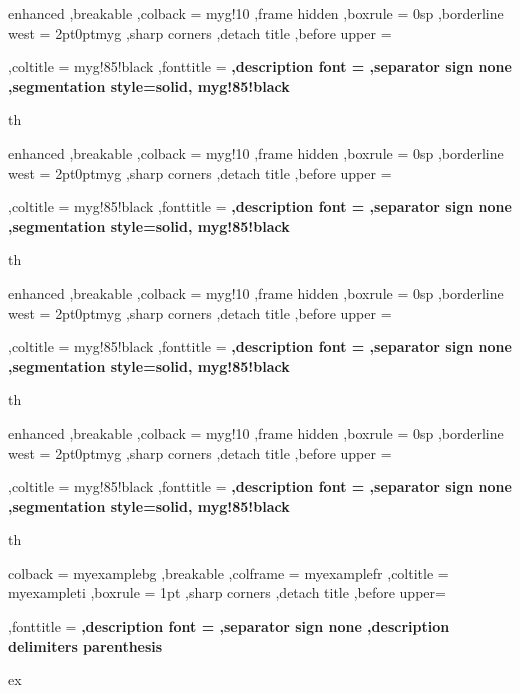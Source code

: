 
{%
	enhanced
	,breakable
	,colback = myg!10
	,frame hidden
	,boxrule = 0sp
	,borderline west = {2pt}{0pt}{myg}
	,sharp corners
	,detach title
	,before upper = \tcbtitle\par\smallskip
	,coltitle = myg!85!black
	,fonttitle = \bfseries\sffamily
	,description font = \mdseries
	,separator sign none
	,segmentation style={solid, myg!85!black}
}
{th}


{%
	enhanced
	,breakable
	,colback = myg!10
	,frame hidden
	,boxrule = 0sp
	,borderline west = {2pt}{0pt}{myg}
	,sharp corners
	,detach title
	,before upper = \tcbtitle\par\smallskip
	,coltitle = myg!85!black
	,fonttitle = \bfseries\sffamily
	,description font = \mdseries
	,separator sign none
	,segmentation style={solid, myg!85!black}
}
{th}


{%
	enhanced
	,breakable
	,colback = myg!10
	,frame hidden
	,boxrule = 0sp
	,borderline west = {2pt}{0pt}{myg}
	,sharp corners
	,detach title
	,before upper = \tcbtitle\par\smallskip
	,coltitle = myg!85!black
	,fonttitle = \bfseries\sffamily
	,description font = \mdseries
	,separator sign none
	,segmentation style={solid, myg!85!black}
}
{th}


{%
	enhanced
	,breakable
	,colback = myg!10
	,frame hidden
	,boxrule = 0sp
	,borderline west = {2pt}{0pt}{myg}
	,sharp corners
	,detach title
	,before upper = \tcbtitle\par\smallskip
	,coltitle = myg!85!black
	,fonttitle = \bfseries\sffamily
	,description font = \mdseries
	,separator sign none
	,segmentation style={solid, myg!85!black}
}
{th}


{%
	colback = myexamplebg
	,breakable
	,colframe = myexamplefr
	,coltitle = myexampleti
	,boxrule = 1pt
	,sharp corners
	,detach title
	,before upper=\tcbtitle\par\smallskip
	,fonttitle = \bfseries
	,description font = \mdseries
	,separator sign none
	,description delimiters parenthesis
}
{ex}

